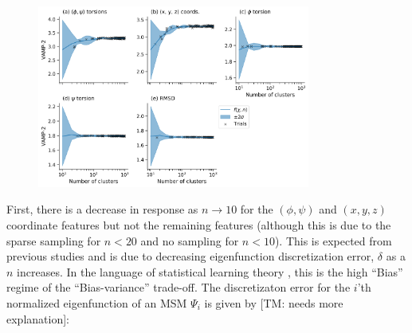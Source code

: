 \begin{figure}
    \centering
    \includegraphics[width=0.8\textwidth]{chapters/msm_optimization/figures/ala1_response_surface.png}
    \label{fig:ala1_response}
\end{figure}

First, there is a decrease in response as $n \rightarrow 10$ for the $(\phi, \psi)$ and $(x,y,z)$ coordinate features but not the remaining features (although this is due to the sparse sampling for $n<20$ and no sampling for $n<10$). This is expected from previous studies \cite{wuVariationalApproachLearning2019}\cite{mcgibbonVariationalCrossvalidationSlow2015} and is due to decreasing eigenfunction discretization error, $\delta$  \cite{prinzMarkovModelsMolecular2011} as a $n$ increases. In the language of statistical learning theory \cite{friedman2001elements}, this is the high ``Bias'' regime of the ``Bias-variance'' trade-off. The discretizaton error for the $i$'th normalized eigenfunction of an MSM $\Psi_{i}$ is given by [TM: needs more explanation]: 

